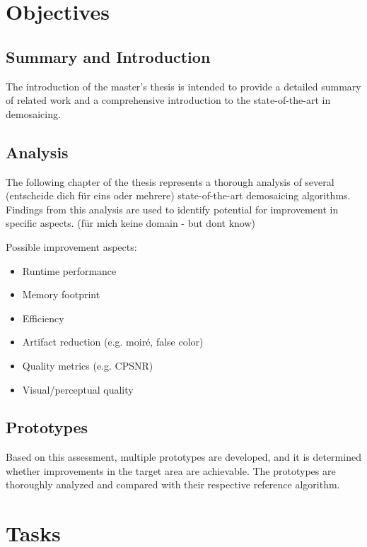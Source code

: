 \documentclass[english,notitlepage,smartquotes]{hgbreport}
\begin{document}
\section{Objectives} %

\subsection{Summary and Introduction}

The introduction of the master's thesis is intended to provide a detailed summary of related work and a comprehensive introduction to the state-of-the-art in demosaicing.

\subsection{Analysis}

The following chapter of the thesis represents a thorough analysis of several (entscheide dich für eins oder mehrere) state-of-the-art demosaicing algorithms. Findings from this analysis are used to identify potential for improvement in specific aspects. (für mich keine domain - but dont know)

\noindent
Possible improvement aspects:

\begin{itemize}
	\item Runtime performance
	\item Memory footprint
	\item Efficiency
	\item Artifact reduction (e.g. moiré, false color)
	\item Quality metrics (e.g. CPSNR)
	\item Visual/perceptual quality
\end{itemize}

\subsection{Prototypes}

Based on this assessment, multiple prototypes are developed, and it is determined whether improvements in the target area are achievable. The prototypes are thoroughly analyzed and compared with their respective reference algorithm.

\section{Tasks}
\end{document}
